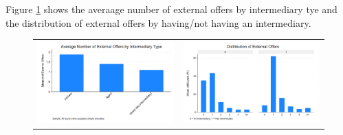 \documentclass[12pt]{article}
\begin{document}




 Figure \ref{fig:ie4_8and9} shows the averaage number of external offers by intermediary tye and the distribution of external offers by having/not having an intermediary. 

 
 
\begin{figure}[H]
\caption{}
 \label{fig:ie4_8and9}
\centering{}%
\begin{tabular}{cc}
\includegraphics[scale=0.17]{../figures/IE4/IE4_external_offers_by_intermediary.png} & \includegraphics[scale=0.17]{../figures/IE4/IE4_external_distribution_by_intermediary.png} 
\end{tabular}
\end{figure} 
 
\end{document}
